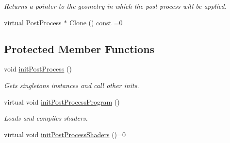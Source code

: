 \begin{DoxyCompactItemize}
\begin{DoxyCompactList}\small\item\em Returns a pointer to the geometry in which the post process will be applied. \end{DoxyCompactList}\item 
virtual \mbox{\hyperlink{class_geometry_engine_1_1_geometry_post_process_1_1_post_process}{Post\+Process}} $\ast$ \mbox{\hyperlink{class_geometry_engine_1_1_geometry_post_process_1_1_post_process_aa80749cf09041335f6b3bda3aaf31711}{Clone}} () const =0
\end{DoxyCompactItemize}
\subsection*{Protected Member Functions}
\begin{DoxyCompactItemize}
\item 
\mbox{\label{class_geometry_engine_1_1_geometry_post_process_1_1_post_process_a9f680e91835d614dcc942fafe43bd3ae}} 
void \mbox{\hyperlink{class_geometry_engine_1_1_geometry_post_process_1_1_post_process_a9f680e91835d614dcc942fafe43bd3ae}{init\+Post\+Process}} ()
\begin{DoxyCompactList}\small\item\em Gets singletons instances and call other inits. \end{DoxyCompactList}\item 
\mbox{\label{class_geometry_engine_1_1_geometry_post_process_1_1_post_process_a1bd949b51ac91a8630d8df0a4e966afa}} 
virtual void \mbox{\hyperlink{class_geometry_engine_1_1_geometry_post_process_1_1_post_process_a1bd949b51ac91a8630d8df0a4e966afa}{init\+Post\+Process\+Program}} ()
\begin{DoxyCompactList}\small\item\em Loads and compiles shaders. \end{DoxyCompactList}\item 
\mbox{\label{class_geometry_engine_1_1_geometry_post_process_1_1_post_process_a8a478b601f4d3021c33cbc376310e235}} 
virtual void \mbox{\hyperlink{class_geometry_engine_1_1_geometry_post_process_1_1_post_process_a8a478b601f4d3021c33cbc376310e235}{init\+Post\+Process\+Shaders}} ()=0

\end{DoxyCompactItemize}
